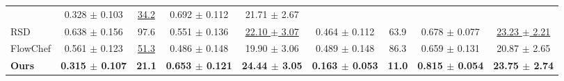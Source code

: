 \begin{table*}[htbp]
{\begin{tabular}{@{}lcccccccc@{}}
        & 0.328 $\pm$ 0.103 & \underline{34.2} & 0.692 $\pm$ 0.112 & 21.71 $\pm$ 2.67\\
      RSD
        & 0.638 $\pm$ 0.156 & 97.6 & 0.551 $\pm$ 0.136 & \underline{22.10 $\pm$ 3.07}
        & 0.464 $\pm$ 0.112 & 63.9 & 0.678 $\pm$ 0.077 & \underline{23.23 $\pm$ 2.21}\\
      FlowChef
        & 0.561 $\pm$ 0.123 & \underline{51.3} & 0.486 $\pm$ 0.148 & 19.90 $\pm$ 3.06
        & 0.489 $\pm$ 0.148 & 86.3 & 0.659 $\pm$ 0.131 & 20.87 $\pm$ 2.65\\
      \rowcolor{myrowcolour}\textbf{Ours}
        & \textbf{0.315 $\pm$ 0.107} & \textbf{21.1} & \textbf{0.653 $\pm$ 0.121} & \textbf{24.44 $\pm$ 3.05}
        & \textbf{0.163 $\pm$ 0.053} & \textbf{11.0} & \textbf{0.815 $\pm$ 0.054} & \textbf{23.75 $\pm$ 2.74}\\
      \bottomrule
    \end{tabular}
  }
\end{table*}